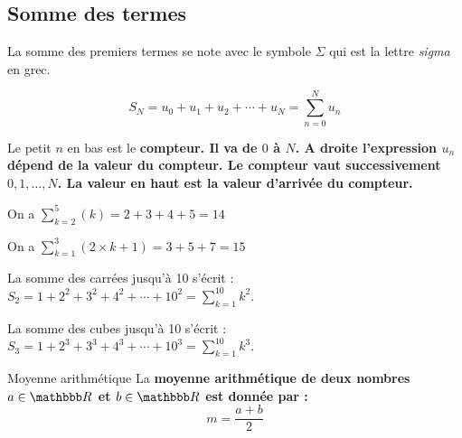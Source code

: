 \documentclass[10pt,a4paper,openany,twoside]{book}
\begin{document}
\begin{ex}{}{}
\begin{minipage}{7cm}
\begin{center}
\end{center}
\end{minipage}
\end{ex}

\subsection{Somme des termes}

\begin{notation}{}{}
	La somme des premiers termes se note avec le symbole $\Sigma$ qui est la lettre \textit{sigma} en grec.

	$$S_N = u_0 + u_1 + u_2 + \cdots + u_N = \sum_{n=0}^{N} u_n$$

	Le petit $n$ en bas est le \bf{compteur}. Il va de $0$ à $N$. A droite l'expression $u_n$ dépend de la valeur du compteur. Le compteur vaut successivement $0, 1, \dots, N$. La valeur en haut est la valeur d'arrivée du compteur.
\end{notation}

\begin{ex}{}{}
	On a $\sum_{k=2}^{5} (k) = 2 +3+4+5 = 14$

	On a $\sum_{k=1}^{3} (2\times k+1) = 3 + 5 + 7 = 15$

	La somme des carrées jusqu'à 10 s'écrit : $S_2 = 1+2^2+3^2+4^2 + \cdots + 10^2 = \sum_{k=1}^{10} k^2$.

	La somme des cubes jusqu'à 10 s'écrit : $S_3 = 1+2^3+3^3+4^3 + \cdots + 10^3 = \sum_{k=1}^{10} k^3$.

\end{ex}


\begin{defi}{Moyenne arithmétique}{}
	La \bf{moyenne arithmétique} de deux nombres $a\in\R$ et $b\in\R$ est donnée par :
	$$m = \frac{a+b}{2}$$
\end{defi}
\end{document}
